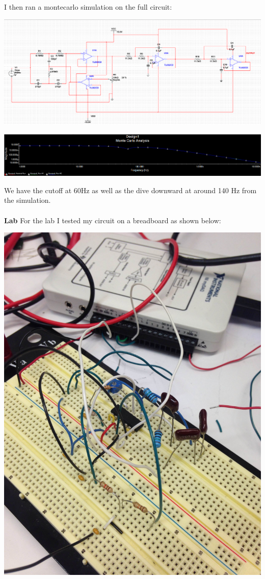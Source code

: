 \documentclass[12pt,letterpaper,boxed]{hmcpset}
\begin{document}
I then ran a montecarlo simulation on the full circuit:
\begin{center}
\includegraphics[scale=.5]{fullcircuit}
\end{center}
\begin{center}
\includegraphics[scale=.5]{FullMontecarlo}
\end{center}
We have the cutoff at 60Hz as well as the dive downward at around 140 Hz from the simulation.\\\\
\textbf{Lab}
For the lab I tested my circuit on a breadboard as shown below:
\begin{center}
\includegraphics[scale=.1]{realcirc}
\end{center}
\end{document}
